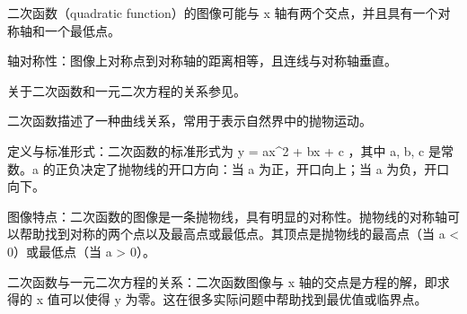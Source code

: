 二次函数（quadratic function）的图像可能与  x  轴有两个交点，并且具有一个对称轴和一个最低点。

轴对称性：图像上对称点到对称轴的距离相等，且连线与对称轴垂直。

关于二次函数和一元二次方程的关系参见。

二次函数描述了一种曲线关系，常用于表示自然界中的抛物运动。

定义与标准形式：二次函数的标准形式为  y = ax^2 + bx + c ，其中 a, b, c 是常数。a 的正负决定了抛物线的开口方向：当 a 为正，开口向上；当 a 为负，开口向下。

图像特点：二次函数的图像是一条抛物线，具有明显的对称性。抛物线的对称轴可以帮助找到对称的两个点以及最高点或最低点。其顶点是抛物线的最高点（当 a < 0）或最低点（当 a > 0）。

二次函数与一元二次方程的关系：二次函数图像与 x 轴的交点是方程的解，即求得的 x 值可以使得 y 为零。这在很多实际问题中帮助找到最优值或临界点。
